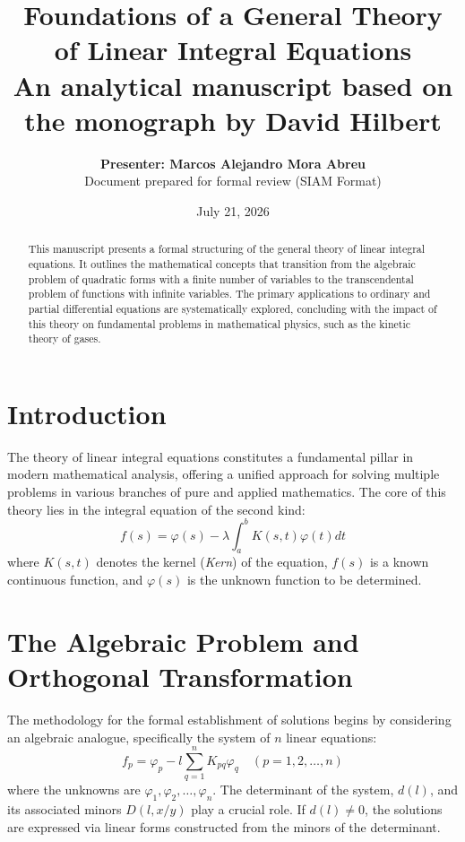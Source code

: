 \documentclass[11pt,a4paper]{article}
\title{\vspace{-1.5cm}\Large \bfseries \sffamily Foundations of a General Theory of Linear Integral Equations\\
\large An analytical manuscript based on the monograph by David Hilbert}
\author{\normalsize \textbf{Presenter: Marcos Alejandro Mora Abreu} \\ \normalsize Document prepared for formal review (SIAM Format)}
\date{\normalsize July 21, 2026}
\begin{document}
\maketitle

\begin{abstract}
This manuscript presents a formal structuring of the general theory of linear integral equations. It outlines the mathematical concepts that transition from the algebraic problem of quadratic forms with a finite number of variables to the transcendental problem of functions with infinite variables. The primary applications to ordinary and partial differential equations are systematically explored, concluding with the impact of this theory on fundamental problems in mathematical physics, such as the kinetic theory of gases.
\end{abstract}

\section{Introduction}
The theory of linear integral equations constitutes a fundamental pillar in modern mathematical analysis, offering a unified approach for solving multiple problems in various branches of pure and applied mathematics. The core of this theory lies in the integral equation of the second kind:
\begin{equation}
f(s) = \varphi(s) - \lambda \int_{a}^{b} K(s,t)\varphi(t)dt
\end{equation}
where $K(s,t)$ denotes the kernel (\textit{Kern}) of the equation, $f(s)$ is a known continuous function, and $\varphi(s)$ is the unknown function to be determined.

\section{The Algebraic Problem and Orthogonal Transformation}
The methodology for the formal establishment of solutions begins by considering an algebraic analogue, specifically the system of $n$ linear equations:
\begin{equation}
f_p = \varphi_p - l \sum_{q=1}^{n} K_{pq}\varphi_q \quad (p = 1, 2, \dots, n)
\end{equation}
where the unknowns are $\varphi_1, \varphi_2, \dots, \varphi_n$. The determinant of the system, $d(l)$, and its associated minors $D(l, x/y)$ play a crucial role. If $d(l) \neq 0$, the solutions are expressed via linear forms constructed from the minors of the determinant. 
\end{document}
